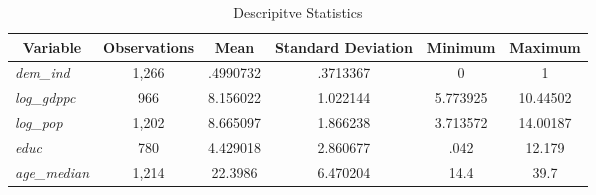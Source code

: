\documentclass{article}
\begin{document}
\begin{center}
\begin{table}[hb!]
\centering
\caption{Descripitve Statistics}
\begin{tabular}{|l|c|c|c|c|c|}
\hline
\multicolumn{1}{|c|}{\textbf{Variable}} & \textbf{Observations} & \textbf{Mean} & \textbf{Standard Deviation} & \textbf{Minimum} & \textbf{Maximum} \\ \hline
\textit{dem\_ind}                       & 1,266               & .4990732      & .3713367                    & 0                & 1                \\ \hline
\textit{log\_gdppc}                        & 966               & 8.156022      & 1.022144                      & 5.773925                & 10.44502                \\ \hline
\textit{log\_pop}                          & 1,202               & 8.665097      & 1.866238                    & 3.713572               & 14.00187               \\ \hline
\textit{educ}                          & 780               & 4.429018      & 2.860677                    & .042                & 12.179                \\ \hline
\textit{age\_median}                          & 1,214               & 22.3986      & 6.470204                    & 14.4                 &  39.7                \\ \hline
\end{tabular}
\end{table}
\end{center}
\end{document}
